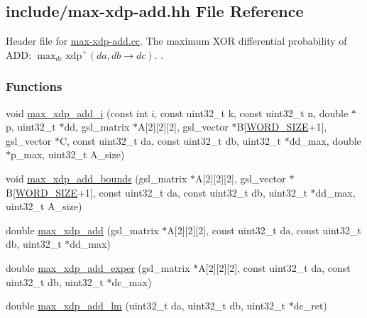 \hypertarget{max-xdp-add_8hh}{\subsection{include/max-\/xdp-\/add.hh \-File \-Reference}
\label{max-xdp-add_8hh}
}


\-Header file for \hyperlink{max-xdp-add_8cc}{max-\/xdp-\/add.\-cc}. \-The maximum \-X\-O\-R differential probability of \-A\-D\-D\-: $\max_{dc} \mathrm{xdp}^{+}(da, db \rightarrow dc)$. .  


\subsubsection*{\-Functions}
\begin{DoxyCompactItemize}
\item 
void \hyperlink{max-xdp-add_8hh_aa26173f5384a2a72da858e5c5c860275}{max\-\_\-xdp\-\_\-add\-\_\-i} (const int i, const uint32\-\_\-t k, const uint32\-\_\-t n, double $\ast$p, uint32\-\_\-t $\ast$dd, gsl\-\_\-matrix $\ast$\-A\mbox{[}2\mbox{]}\mbox{[}2\mbox{]}\mbox{[}2\mbox{]}, gsl\-\_\-vector $\ast$\-B\mbox{[}\hyperlink{common_8hh_a92ed8507d1cd2331ad09275c5c4c1c89}{\-W\-O\-R\-D\-\_\-\-S\-I\-Z\-E}+1\mbox{]}, gsl\-\_\-vector $\ast$\-C, const uint32\-\_\-t da, const uint32\-\_\-t db, uint32\-\_\-t $\ast$dd\-\_\-max, double $\ast$p\-\_\-max, uint32\-\_\-t \-A\-\_\-size)
\item 
void \hyperlink{max-xdp-add_8hh_a248a6a0d0f09adf7a773cd7f1fb1fbe8}{max\-\_\-xdp\-\_\-add\-\_\-bounds} (gsl\-\_\-matrix $\ast$\-A\mbox{[}2\mbox{]}\mbox{[}2\mbox{]}\mbox{[}2\mbox{]}, gsl\-\_\-vector $\ast$\-B\mbox{[}\hyperlink{common_8hh_a92ed8507d1cd2331ad09275c5c4c1c89}{\-W\-O\-R\-D\-\_\-\-S\-I\-Z\-E}+1\mbox{]}, const uint32\-\_\-t da, const uint32\-\_\-t db, uint32\-\_\-t $\ast$dd\-\_\-max, uint32\-\_\-t \-A\-\_\-size)
\item 
double \hyperlink{max-xdp-add_8hh_a19d57935afe7dabc0628a3ea44c1f135}{max\-\_\-xdp\-\_\-add} (gsl\-\_\-matrix $\ast$\-A\mbox{[}2\mbox{]}\mbox{[}2\mbox{]}\mbox{[}2\mbox{]}, const uint32\-\_\-t da, const uint32\-\_\-t db, uint32\-\_\-t $\ast$dd\-\_\-max)
\item 
double \hyperlink{max-xdp-add_8hh_a54f1b6c27d0b3ef04dddcc1e190bc279}{max\-\_\-xdp\-\_\-add\-\_\-exper} (gsl\-\_\-matrix $\ast$\-A\mbox{[}2\mbox{]}\mbox{[}2\mbox{]}\mbox{[}2\mbox{]}, const uint32\-\_\-t da, const uint32\-\_\-t db, uint32\-\_\-t $\ast$dc\-\_\-max)
\item 
double \hyperlink{max-xdp-add_8hh_a1eda58229e5333a889252e475da39f67}{max\-\_\-xdp\-\_\-add\-\_\-lm} (uint32\-\_\-t da, uint32\-\_\-t db, uint32\-\_\-t $\ast$dc\-\_\-ret)
\end{DoxyCompactItemize}


